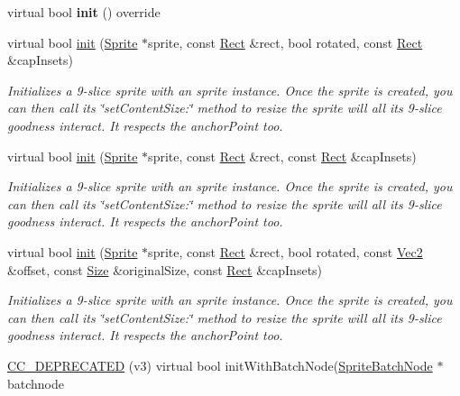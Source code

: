 \begin{DoxyCompactItemize}
\item 
\mbox{\label{classui_1_1Scale9Sprite_a41282fe81351f86ed3c56a5f9c936bd5}} 
virtual bool {\bfseries init} () override
\item 
virtual bool \hyperlink{classui_1_1Scale9Sprite_a9511895e36dc78a97a39aaf58f56d2ea}{init} (\hyperlink{classSprite}{Sprite} $\ast$sprite, const \hyperlink{classRect}{Rect} \&rect, bool rotated, const \hyperlink{classRect}{Rect} \&cap\+Insets)
\begin{DoxyCompactList}\small\item\em Initializes a 9-\/slice sprite with an sprite instance. Once the sprite is created, you can then call its \char`\"{}set\+Content\+Size\+:\char`\"{} method to resize the sprite will all it\textquotesingle{}s 9-\/slice goodness interact. It respects the anchor\+Point too. \end{DoxyCompactList}\item 
virtual bool \hyperlink{classui_1_1Scale9Sprite_a286b191a7c6f4c30371ac5df58e3c910}{init} (\hyperlink{classSprite}{Sprite} $\ast$sprite, const \hyperlink{classRect}{Rect} \&rect, const \hyperlink{classRect}{Rect} \&cap\+Insets)
\begin{DoxyCompactList}\small\item\em Initializes a 9-\/slice sprite with an sprite instance. Once the sprite is created, you can then call its \char`\"{}set\+Content\+Size\+:\char`\"{} method to resize the sprite will all it\textquotesingle{}s 9-\/slice goodness interact. It respects the anchor\+Point too. \end{DoxyCompactList}\item 
virtual bool \hyperlink{classui_1_1Scale9Sprite_a920be73b906c57c569f53d6f1b505ecd}{init} (\hyperlink{classSprite}{Sprite} $\ast$sprite, const \hyperlink{classRect}{Rect} \&rect, bool rotated, const \hyperlink{classVec2}{Vec2} \&offset, const \hyperlink{classSize}{Size} \&original\+Size, const \hyperlink{classRect}{Rect} \&cap\+Insets)
\begin{DoxyCompactList}\small\item\em Initializes a 9-\/slice sprite with an sprite instance. Once the sprite is created, you can then call its \char`\"{}set\+Content\+Size\+:\char`\"{} method to resize the sprite will all it\textquotesingle{}s 9-\/slice goodness interact. It respects the anchor\+Point too. \end{DoxyCompactList}\item 
\hyperlink{classui_1_1Scale9Sprite_ac7989890a826ab703510c852f87e9ebe}{C\+C\+\_\+\+D\+E\+P\+R\+E\+C\+A\+T\+ED} (v3) virtual bool init\+With\+Batch\+Node(\hyperlink{classSpriteBatchNode}{Sprite\+Batch\+Node} $\ast$batchnode

\end{DoxyCompactItemize}
